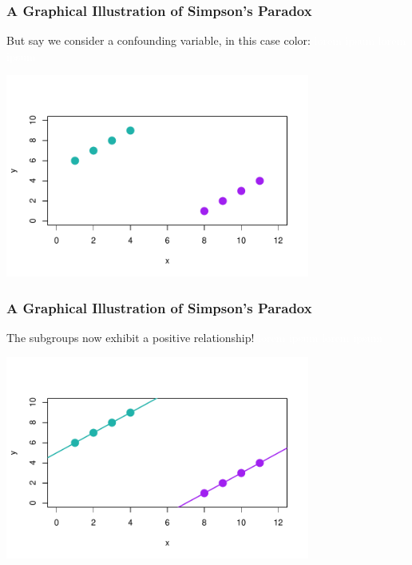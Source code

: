 \documentclass[handout]{beamer}
\newcommand{\blue}[1]{\textcolor{blue2}{#1}}
\begin{document}
\begin{frame}
\frametitle{A Graphical Illustration of Simpson's Paradox}
But say we consider a \blue{confounding} variable, in this case \blue{color}: \textcolor{white}{lorem ipsum lorem ipsum}
\begin{center}
\includegraphics[width=10cm]{figure/simpsons3.pdf}
\end{center}

\end{frame}



\begin{frame}
\frametitle{A Graphical Illustration of Simpson's Paradox}
The subgroups now exhibit a \blue{positive} relationship! \textcolor{white}{lorem ipsum lorem ipsum}
\begin{center}
\includegraphics[width=10cm]{figure/simpsons4.pdf}
\end{center}

\end{frame}
\end{document}
